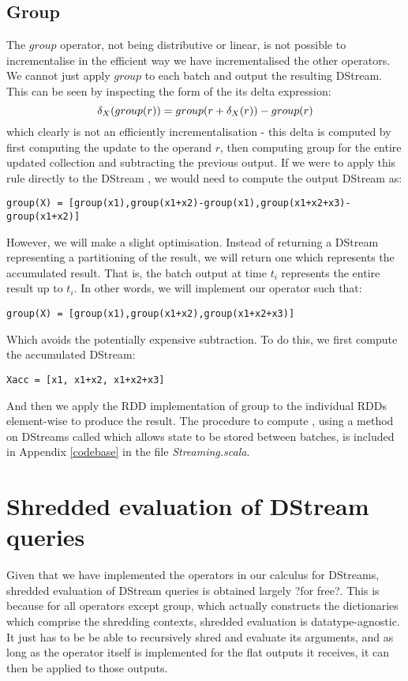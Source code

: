 \subsection{Group}
The $group$ operator, not being distributive or linear, is not possible to incrementalise in the efficient way we have incrementalised the other operators. We cannot just apply $group$ to each batch and output the resulting DStream. This can be seen by inspecting the form of the its delta expression:
\begin{equation*}
\delta_X(group(r)) = group(r + \delta_X(r)) - group(r)
\end{equation*}
which clearly is not an efficiently incrementalisation - this delta is computed by first computing the update to the operand $r$, then computing group for the entire updated collection and subtracting the previous output. If we were to apply this rule directly to the DStream , we would need to compute the output DStream as:
\vs\begin{lstlisting}
group(X) = [group(x1),group(x1+x2)-group(x1),group(x1+x2+x3)-group(x1+x2)]
\end{lstlisting}\vs
However, we will make a slight optimisation. Instead of returning a DStream representing a partitioning of the result, we will return one which represents the accumulated result. That is, the batch output at time $t_i$ represents the entire result up to $t_i$. In other words, we will implement our operator such that:
\vs\begin{lstlisting}
group(X) = [group(x1),group(x1+x2),group(x1+x2+x3)]
\end{lstlisting}\vs
Which avoids the potentially expensive subtraction. To do this, we first compute the accumulated DStream:
\vs\begin{lstlisting}
Xacc = [x1, x1+x2, x1+x2+x3]
\end{lstlisting}
And then we apply the RDD implementation of group to the individual RDDs element-wise to produce the result. The procedure to compute , using a method on DStreams called  which allows state to be stored between batches, is included in Appendix \ref{codebase} in the file \textit{Streaming.scala}.


\section{Shredded evaluation of DStream queries}

Given that we have implemented the operators in our calculus for DStreams, shredded evaluation of DStream queries is obtained largely ?for free?. This is because for all operators except group, which actually constructs the dictionaries which comprise the shredding contexts, shredded evaluation is datatype-agnostic. It just has to be be able to recursively shred and evaluate its arguments, and as long as the operator itself is implemented for the flat outputs it receives, it can then be applied to those outputs.

